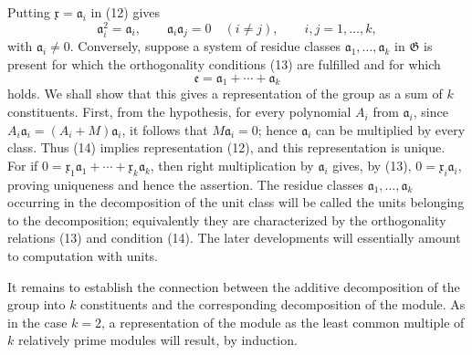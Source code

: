 \documentclass[11pt]{article}
\newcommand{\mG}{\mathfrak{G}}
\newcommand{\ma}{\mathfrak{a}}
\newcommand{\mx}{\mathfrak{x}}
\newcommand{\me}{\mathfrak{e}}
\begin{document}
Putting $\mx=\ma_i$ in (12) gives
\begin{equation}
 \ma_i^2=\ma_i,
 \qquad \ma_i\ma_j=0\quad(i\ne j),
 \qquad i,j=1,\ldots,k,
\tag{13}
\end{equation}
with $\ma_i\ne0$. Conversely, suppose a system of residue classes $\ma_1,\ldots,\ma_k$ in $\mG$ is present for which the orthogonality conditions (13) are fulfilled and for which
\begin{equation}
 \me=\ma_1+\cdots+\ma_k
\tag{14}
\end{equation}
holds. We shall show that this gives a representation of the group as a sum of $k$ constituents. First, from the hypothesis, for every polynomial $A_i$ from $\ma_i$, since $A_i\ma_i=(A_i+M)\ma_i$, it follows that $M\ma_i=0$; hence $\ma_i$ can be multiplied by every class. Thus (14) implies representation (12), and this representation is unique. For if $0=\mx_1\ma_1+\cdots+\mx_k\ma_k$, then right multiplication by $\ma_i$ gives, by (13), $0=\mx_i\ma_i$, proving uniqueness and hence the assertion. The residue classes $\ma_1,
\ldots,\ma_k$ occurring in the decomposition of the unit class will be called the units belonging to the decomposition; equivalently they are characterized by the orthogonality relations (13) and condition (14). The later developments will essentially amount to computation with units.

It remains to establish the connection between the additive decomposition of the group into $k$ constituents and the corresponding decomposition of the module. As in the case $k=2$, a representation of the module as the least common multiple of $k$ relatively prime modules will result, by induction.
\end{document}
